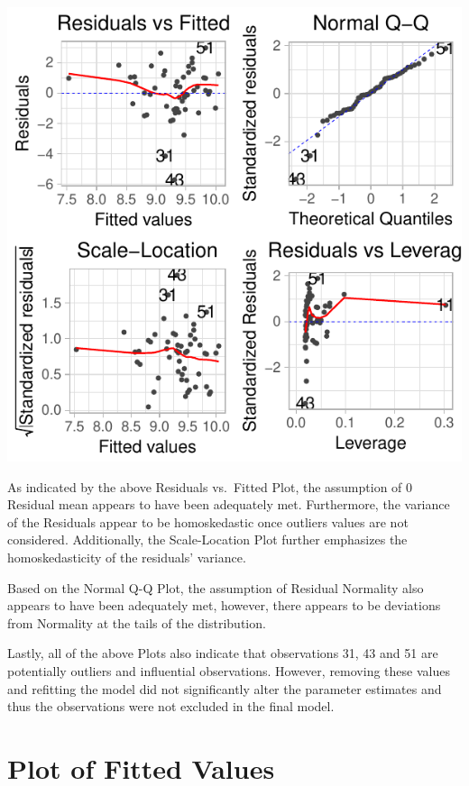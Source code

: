 \documentclass[12pt,]{article}
\begin{document}
\begin{center}\includegraphics{report_files/figure-latex/mod_resid_analysis-1} \end{center}

As indicated by the above Residuals vs.~Fitted Plot, the assumption of 0
Residual mean appears to have been adequately met. Furthermore, the
variance of the Residuals appear to be homoskedastic once outliers
values are not considered. Additionally, the Scale-Location Plot further
emphasizes the homoskedasticity of the residuals' variance.

Based on the Normal Q-Q Plot, the assumption of Residual Normality also
appears to have been adequately met, however, there appears to be
deviations from Normality at the tails of the distribution.

Lastly, all of the above Plots also indicate that observations 31, 43
and 51 are potentially outliers and influential observations. However,
removing these values and refitting the model did not significantly
alter the parameter estimates and thus the observations were not
excluded in the final model.

\section{Plot of Fitted Values}\label{plot-of-fitted-values}
\end{document}
